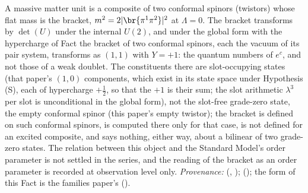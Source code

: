 A massive matter unit is a composite of two conformal spinors (twistors) whose flat mass is the bracket, $m^{2} = 2|\br{\pi^{1}\pi^{2}}|^{2}$ at $\Lambda = 0$. The bracket transforms by $\det(U)$ under the internal $U(2)$, and under the global form with the hypercharge of Fact  the bracket of two conformal spinors, each the vacuum of its pair system, transforms as $(1,1)$ with $Y = +1$: the quantum numbers of $e^{c}$, and not those of a weak doublet. The constituents there are slot-occupying states (that paper's $(1,0)$ components, which exist in its state space under Hypothesis (S), each of hypercharge $+\tfrac12$, so that the $+1$ is their sum; the slot arithmetic $\lambda^{3}$ per slot is unconditional in the global form), not the slot-free grade-zero state, the empty conformal spinor (this paper's empty twistor); the bracket is defined on such conformal spinors, is computed there only for that case, is not defined for an excited composite, and says nothing, either way, about a bilinear of two grade-zero states. The relation between this object and the Standard Model's order parameter is not settled in the series, and the reading of the bracket as an order parameter is recorded at observation level only. \emph{Provenance:} \cite[Props.~3.1-3.2]{ButlerT12} (, ); \cite[Prop.~4.1]{ButlerT11} (); the form of this Fact is the families paper's \cite[Fact~2.1]{ButlerT13} ().
